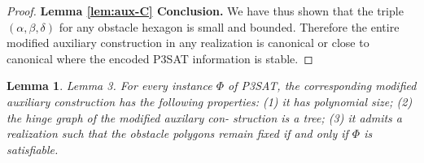 \documentclass[10pt]{CSUNthesis}
\theoremstyle{plain}%
\newtheorem{lem}{Lemma}
\theoremstyle{definition}
\theoremstyle{remark}
\newcommand{\vlr}[1]{\left\vert #1 \right\vert}
\begin{document}
\begin{proof}





\textbf{Lemma \ref{lem:aux-C} Conclusion.} We have thus shown that the triple $(\alpha, \beta, \delta)$ for any obstacle hexagon is small and bounded.  
Therefore the entire modified auxiliary construction in any realization is canonical or close to canonical where the encoded P3SAT information is stable.
\end{proof}\begin{lem}\label{lem:lePieceDuResistance}
Lemma 3. For every instance $\Phi$ of P3SAT, the corresponding modified auxiliary construction
has the following properties: (1) it has polynomial size; (2) the hinge graph of the modified auxilary con-
struction is a tree; (3) it admits a realization such that the obstacle polygons remain fixed if and only if $\Phi$ is
satisfiable.
\end{lem}
\end{document}
